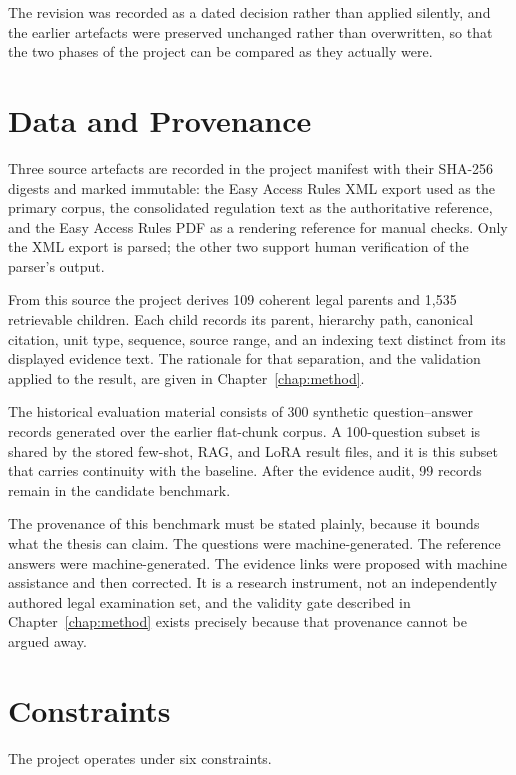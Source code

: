 The revision was recorded as a dated decision rather than applied silently, and the earlier artefacts were preserved unchanged rather than overwritten, so that the two phases of the project can be compared as they actually were.

\section{Data and Provenance}
\label{sec:context-data}

Three source artefacts are recorded in the project manifest with their SHA-256 digests and marked immutable: the Easy Access Rules XML export used as the primary corpus, the consolidated regulation text as the authoritative reference, and the Easy Access Rules PDF as a rendering reference for manual checks. Only the XML export is parsed; the other two support human verification of the parser's output.

From this source the project derives 109 coherent legal parents and 1{,}535 retrievable children. Each child records its parent, hierarchy path, canonical citation, unit type, sequence, source range, and an indexing text distinct from its displayed evidence text. The rationale for that separation, and the validation applied to the result, are given in Chapter~\ref{chap:method}.

The historical evaluation material consists of 300 synthetic question--answer records generated over the earlier flat-chunk corpus. A 100-question subset is shared by the stored few-shot, \ac{RAG}, and \ac{LoRA} result files, and it is this subset that carries continuity with the baseline. After the evidence audit, 99 records remain in the candidate benchmark.

The provenance of this benchmark must be stated plainly, because it bounds what the thesis can claim. The questions were machine-generated. The reference answers were machine-generated. The evidence links were proposed with machine assistance and then corrected. It is a research instrument, not an independently authored legal examination set, and the validity gate described in Chapter~\ref{chap:method} exists precisely because that provenance cannot be argued away.

\section{Constraints}
\label{sec:context-constraints}

The project operates under six constraints.

